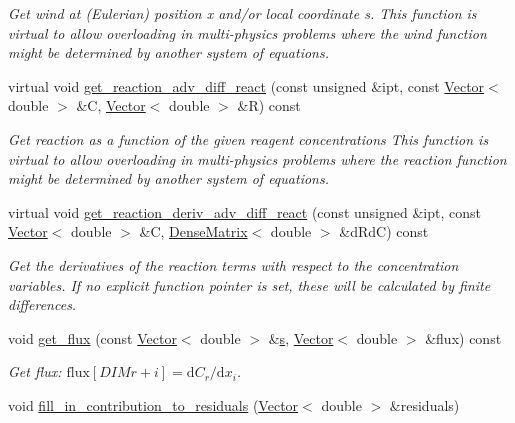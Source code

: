\begin{DoxyCompactItemize}
\begin{DoxyCompactList}\small\item\em Get wind at (Eulerian) position x and/or local coordinate s. This function is virtual to allow overloading in multi-\/physics problems where the wind function might be determined by another system of equations. \end{DoxyCompactList}\item 
virtual void \hyperlink{classoomph_1_1AdvectionDiffusionReactionEquations_afcd57b515d90c0a55406d11ec6316856}{get\+\_\+reaction\+\_\+adv\+\_\+diff\+\_\+react} (const unsigned \&ipt, const \hyperlink{classoomph_1_1Vector}{Vector}$<$ double $>$ \&C, \hyperlink{classoomph_1_1Vector}{Vector}$<$ double $>$ \&R) const
\begin{DoxyCompactList}\small\item\em Get reaction as a function of the given reagent concentrations This function is virtual to allow overloading in multi-\/physics problems where the reaction function might be determined by another system of equations. \end{DoxyCompactList}\item 
virtual void \hyperlink{classoomph_1_1AdvectionDiffusionReactionEquations_a14deb197bcb3ddb01798c98b2942f5d0}{get\+\_\+reaction\+\_\+deriv\+\_\+adv\+\_\+diff\+\_\+react} (const unsigned \&ipt, const \hyperlink{classoomph_1_1Vector}{Vector}$<$ double $>$ \&C, \hyperlink{classoomph_1_1DenseMatrix}{Dense\+Matrix}$<$ double $>$ \&d\+RdC) const
\begin{DoxyCompactList}\small\item\em Get the derivatives of the reaction terms with respect to the concentration variables. If no explicit function pointer is set, these will be calculated by finite differences. \end{DoxyCompactList}\item 
void \hyperlink{classoomph_1_1AdvectionDiffusionReactionEquations_a492af587e1c592b0fb9ffe525d6509d2}{get\+\_\+flux} (const \hyperlink{classoomph_1_1Vector}{Vector}$<$ double $>$ \&\hyperlink{cfortran_8h_ab7123126e4885ef647dd9c6e3807a21c}{s}, \hyperlink{classoomph_1_1Vector}{Vector}$<$ double $>$ \&flux) const
\begin{DoxyCompactList}\small\item\em Get flux\+: $\mbox{flux}[DIM r + i] = \mbox{d}C_{r} / \mbox{d}x_i $. \end{DoxyCompactList}\item 
void \hyperlink{classoomph_1_1AdvectionDiffusionReactionEquations_a0cf72be1f384151d58b26ced55b1ade0}{fill\+\_\+in\+\_\+contribution\+\_\+to\+\_\+residuals} (\hyperlink{classoomph_1_1Vector}{Vector}$<$ double $>$ \&residuals)

\end{DoxyCompactItemize}
